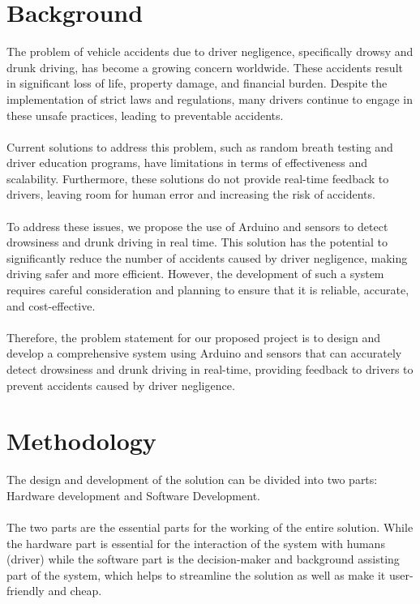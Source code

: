 \documentclass{article}
\begin{document}
\section{Background}
The problem of vehicle accidents due to driver negligence, specifically drowsy and drunk driving, has become a growing concern worldwide. These accidents result in significant loss of life, property damage, and financial burden. Despite the implementation of strict laws and regulations, many drivers continue to engage in these unsafe practices, leading to preventable accidents.
\\ \\
Current solutions to address this problem, such as random breath testing and driver education programs, have limitations in terms of effectiveness and scalability. Furthermore, these solutions do not provide real-time feedback to drivers, leaving room for human error and increasing the risk of accidents.
\\ \\
To address these issues, we propose the use of Arduino and sensors to detect drowsiness and drunk driving in real time. This solution has the potential to significantly reduce the number of accidents caused by driver negligence, making driving safer and more efficient. However, the development of such a system requires careful consideration and planning to ensure that it is reliable, accurate, and cost-effective.
\\ \\
Therefore, the problem statement for our proposed project is to design and develop a comprehensive system using Arduino and sensors that can accurately detect drowsiness and drunk driving in real-time, providing feedback to drivers to prevent accidents caused by driver negligence.

\section{Methodology}
The design and development of the solution can be divided into two parts: Hardware development and Software Development. 
\\ \\ 
The two parts are the essential parts for the working of the entire solution.  While the hardware part is essential for the interaction of the system with humans (driver) while the software part is the decision-maker and background assisting part of the system, which helps to streamline the solution as well as make it user-friendly and cheap. 
\end{document}
